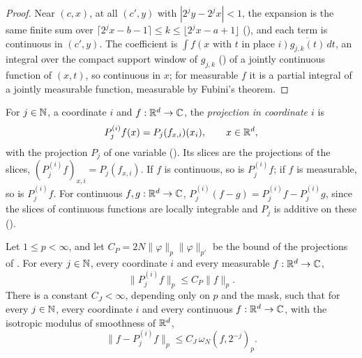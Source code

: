 \begin{proof}
\leanok
{}
Near $(c, x)$, at all $(c', y)$ with $|2^j y - 2^j x| < 1$, the expansion is the same finite sum
over $\lceil 2^j x - b - 1 \rceil \leq k \leq \lfloor 2^j x - a + 1 \rfloor$
(), and each term is continuous in $(c', y)$. The coefficient is
$\int f(x \text{ with } t \text{ in place } i) \overline{g_{j,k}(t)} \, dt$, an integral over the
compact support window of $g_{j,k}$ () of a jointly continuous
function of $(x, t)$, so continuous in $x$; for measurable $f$ it is a partial integral of a
jointly measurable function, measurable by Fubini's theorem.
\end{proof}

\begin{definition}
\label{def:daub-rd-slice-proj}
\leanok
{}
For $j \in \mathbb{N}$, a coordinate $i$ and $f : \mathbb{R}^d \to \mathbb{C}$, the \emph{projection in coordinate $i$}
is
\[
  P^{(i)}_j f(x) = P_j(f_{x,i})(x_i) , \qquad x \in \mathbb{R}^d ,
\]
with the projection $P_j$ of one variable (). Its slices are the
projections of the slices, $(P^{(i)}_j f)_{x,i} = P_j(f_{x,i})$. If $f$ is continuous, so is
$P^{(i)}_j f$; if $f$ is measurable, so is $P^{(i)}_j f$. For continuous $f, g : \mathbb{R}^d \to \mathbb{C}$,
$P^{(i)}_j (f - g) = P^{(i)}_j f - P^{(i)}_j g$, since the slices of continuous functions are
locally integrable and $P_j$ is additive on these ().
\end{definition}

\begin{proposition}
\label{prop:daub-rd-coordinate-direct}
\leanok
{}
Let $1 \leq p < \infty$, and let $C_P = 2N \|\varphi\|_p \|\varphi\|_{p'}$ be the bound of the
projections of . For every $j \in \mathbb{N}$, every coordinate $i$ and every
measurable $f : \mathbb{R}^d \to \mathbb{C}$,
\[
  \|P^{(i)}_j f\|_p \leq C_P \|f\|_p .
\]
There is a constant $C_J < \infty$, depending only on $p$ and the mask, such that for every
$j \in \mathbb{N}$, every coordinate $i$ and every continuous $f : \mathbb{R}^d \to \mathbb{C}$, with the isotropic
modulus of smoothness of $\mathbb{R}^d$,
\[
  \|f - P^{(i)}_j f\|_p \leq C_J \, \omega_N(f, 2^{-j})_p .
\]
\end{proposition}

